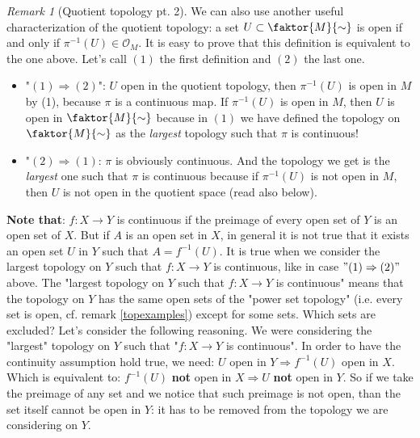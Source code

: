 \documentclass[a4paper,11pt,titlepage, article, oneside]{memoir}
\numberwithin{equation}{section}
\theoremstyle{definition}
\theoremstyle{remark}
\newtheorem{remark}[theorem]{Remark}
\begin{document}
\begin{remarkbox}\begin{remark}[Quotient topology pt. 2]
We can also use another useful characterization of the quotient topology: a set $U \subset \faktor{M}{\sim}$ is open if and only if $\pi^{-1}(U) \in \mathcal{O}_M$. It is easy to prove that this definition is equivalent to the one above. Let's call $(1)$ the first definition and $(2)$ the last one.
\begin{itemize}
\item "$(1) \Rightarrow (2)$": $U$ open in the quotient topology, then $\pi^{-1}(U)$ is open in $M$ by (1), because $\pi$ is a continuous map. If $\pi^{-1}(U)$ is open in $M$, then $U$ is open in $\faktor{M}{\sim}$ because in $(1)$ we have defined the topology on $\faktor{M}{\sim}$ as the \textit{largest} topology such that $\pi$ is continuous!
\item "$(2) \Rightarrow (1)$: $\pi$ is obviously continuous. And the topology we get is the \textit{largest} one such that $\pi$ is continuous because if $\pi^{-1}(U)$ is not open in $M$, then $U$ is not open in the quotient space (read also below).
\end{itemize}
\textbf{Note that}: $f\colon X \rightarrow Y$ is continuous if the preimage of every open set of $Y$ is an open set of $X$. But if $A$ is an open set in $X$, in general it is not true that it exists an open set $U$ in $Y$ such that $A = f^{-1}(U)$. It is true when we consider the largest topology on $Y$ such that $f\colon X \rightarrow Y$ is continuous, like in case $"(1) \Rightarrow (2)"$ above. The "largest topology on $Y$ such that $f\colon X \rightarrow Y$ is continuous" means that the topology on $Y$ has the same open sets of the "power set topology" (i.e. every set is open, cf. remark \ref{topexamples}) except for some sets. Which sets are excluded? Let's consider the following reasoning. We were considering the "largest" topology on $Y$ such that "$f\colon X \rightarrow Y$ is continuous". In order to have the continuity assumption hold true, we need: $U$ open in $Y \Rightarrow f^{-1}(U)$ open in $X$. Which is equivalent to: $f^{-1}(U)$ \textbf{not} open in $X \Rightarrow U$ \textbf{not} open in $Y$. So if we take the preimage of any set and we notice that such preimage is not open, than the set itself cannot be open in $Y$: it has to be removed from the topology we are considering on $Y$.
\end{remark}\end{remarkbox}
\end{document}
